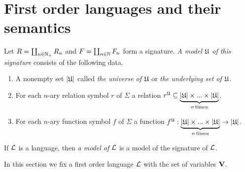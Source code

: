 \section{First order languages and their semantics}

\begin{definition}
Let $R = \coprod_{n\in {\mathbb N}_+}R_n$ and $F = \coprod_{n\in {\mathbb N}}F_n$ form a signature. \textit{A model ${\mathfrak U}$ of this signature} consists of the following data.
\begin{enumerate}[label=\textbf{(\arabic*)}, leftmargin=3.0em]
\item A nonempty set $|{\mathfrak U}|$ called \textit{the universe of ${\mathfrak U}$} or \textit{the underlying set of ${\mathfrak U}$}.
\item For each $n$-ary relation symbol $r$ of $\Sigma$ a relation $r^{\mathfrak U} \subseteq \underbrace{|{\mathfrak U}| \times ... \times |{\mathfrak U}|}_{n\,\mathrm{times}}$.
\item For each $n$-ary function symbol $f$ of $\Sigma$ a function $f^{\mathfrak U}:\underbrace{|{\mathfrak U}| \times ... \times |{\mathfrak U}|}_{n\,\mathrm{times}} \rightarrow |{\mathfrak U}|$.
\end{enumerate}
If ${\mathcal L}$ is a language, then \textit{a model of ${\mathcal L}$} is a model of the signature of ${\mathcal L}$.
\end{definition}
\noindent
In this section we fix a first order language ${\mathcal L}$ with the set of variables $\mathbf{V}$.

